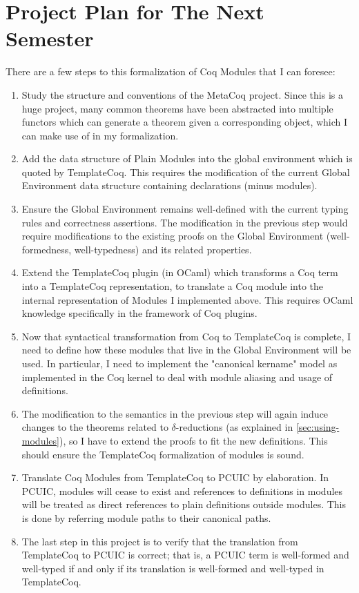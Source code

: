 \chapter{Project Plan for The Next Semester}

There are a few steps to this formalization of Coq Modules that I can foresee:
\begin{enumerate}
\item Study the structure and conventions of the MetaCoq project. Since this is 
    a huge project, many common theorems have been abstracted into multiple
    functors which can generate a theorem given a corresponding object, which
    I can make use of in my formalization.
\item Add the data structure of Plain Modules into the global environment which
    is quoted by TemplateCoq. This requires the modification of the current Global
    Environment data structure containing declarations (minus modules). 
\item Ensure the Global Environment remains well-defined with the current typing rules
    and correctness assertions. The modification in the previous step would require
    modifications to the existing 
    proofs on the Global Environment (well-formedness, well-typedness) and its 
    related properties.
\item Extend the TemplateCoq plugin (in OCaml) which transforms a Coq term into 
    a TemplateCoq representation, to translate a Coq module into the internal
    representation of Modules I implemented above. This requires OCaml knowledge
    specifically in the framework of Coq plugins.
\item Now that syntactical transformation from Coq to TemplateCoq is complete, I
    need to define how these modules that live in the Global Environment will 
    be used. In particular, I need to implement the "canonical kername" model as
    implemented in the Coq kernel to deal with module aliasing and usage of definitions.
\item The modification to the semantics in the previous step will again induce 
    changes to the theorems related to $\delta$-reductions (as explained in \ref{sec:using-modules}),
    so I have to extend the proofs to fit the new definitions. This should 
    ensure the TemplateCoq formalization of modules is sound.
\item Translate Coq Modules from TemplateCoq to PCUIC by elaboration. In PCUIC,
    modules will cease to exist and references to definitions in modules will be
    treated as direct references to plain definitions outside modules. This is
    done by referring module paths to their canonical paths.
\item The last step in this project is to verify that the translation from
    TemplateCoq to PCUIC is correct; that is, a PCUIC term is 
    well-formed and well-typed if and only if its translation is well-formed and well-typed
    in TemplateCoq.
\end{enumerate}

